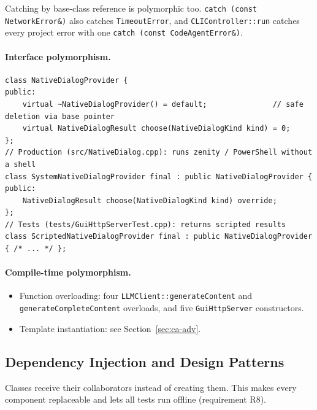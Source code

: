 \documentclass[12pt,a4paper,oneside]{book}
\begin{document}
Catching by base-class reference is polymorphic too.
\texttt{catch (const NetworkError\&)} also catches \texttt{TimeoutError}, and
\texttt{CLIController::\allowbreak{}run} catches every project error with one
\texttt{catch (const CodeAgentError\&)}.

\paragraph{Interface polymorphism.}
\begin{lstlisting}[style=codeagentcpp,caption={Interface with a virtual destructor and two implementations},label={lst:ca-iface}]
class NativeDialogProvider {
public:
    virtual ~NativeDialogProvider() = default;               // safe deletion via base pointer
    virtual NativeDialogResult choose(NativeDialogKind kind) = 0;
};
// Production (src/NativeDialog.cpp): runs zenity / PowerShell without a shell
class SystemNativeDialogProvider final : public NativeDialogProvider {
public:
    NativeDialogResult choose(NativeDialogKind kind) override;
};
// Tests (tests/GuiHttpServerTest.cpp): returns scripted results
class ScriptedNativeDialogProvider final : public NativeDialogProvider { /* ... */ };
\end{lstlisting}

\paragraph{Compile-time polymorphism.}
\begin{itemize}
  \item Function overloading: four \texttt{LLMClient::\allowbreak{}generateContent} and
    \texttt{generateCompleteContent} overloads, and five
    \texttt{GuiHttpServer} constructors.
  \item Template instantiation: see Section~\ref{sec:ca-adv}.
\end{itemize}

\subsection{Dependency Injection and Design Patterns}

Classes receive their collaborators instead of creating them. This makes every
component replaceable and lets all tests run offline (requirement R8).
\end{document}
